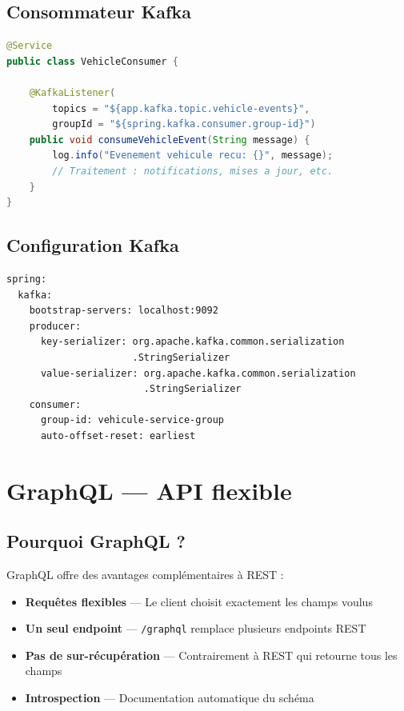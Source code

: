 \documentclass[12pt,a4paper]{report}
\begin{document}
\section{Consommateur Kafka}

\begin{lstlisting}[style=javastyle, language=Java, caption={VehicleConsumer.java}]
@Service
public class VehicleConsumer {

    @KafkaListener(
        topics = "${app.kafka.topic.vehicle-events}",
        groupId = "${spring.kafka.consumer.group-id}")
    public void consumeVehicleEvent(String message) {
        log.info("Evenement vehicule recu: {}", message);
        // Traitement : notifications, mises a jour, etc.
    }
}
\end{lstlisting}

\section{Configuration Kafka}

\begin{lstlisting}[style=yamlstyle, caption={Configuration Kafka dans application.yml}]
spring:
  kafka:
    bootstrap-servers: localhost:9092
    producer:
      key-serializer: org.apache.kafka.common.serialization
                      .StringSerializer
      value-serializer: org.apache.kafka.common.serialization
                        .StringSerializer
    consumer:
      group-id: vehicule-service-group
      auto-offset-reset: earliest
\end{lstlisting}

\chapter{GraphQL --- API flexible}

\section{Pourquoi GraphQL ?}

GraphQL offre des avantages compl\'ementaires \`a REST :
\begin{itemize}
    \item \textbf{Requ\^etes flexibles} --- Le client choisit exactement les champs voulus
    \item \textbf{Un seul endpoint} --- \texttt{/graphql} remplace plusieurs endpoints REST
    \item \textbf{Pas de sur-r\'ecup\'eration} --- Contrairement \`a REST qui retourne tous les champs
    \item \textbf{Introspection} --- Documentation automatique du sch\'ema
\end{itemize}
\end{document}
